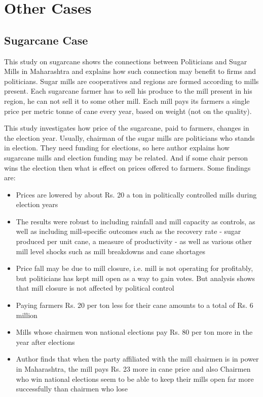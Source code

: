 \section{ Other Cases}

\subsection{Sugarcane Case}

This \cite{sugarcane} study on sugarcane shows the connections between Politicians and Sugar Mills in Maharashtra and explains how such connection may benefit to firms and politicians. Sugar mills are cooperatives and regions are formed according to mills present. Each sugarcane farmer has to sell his produce to the mill present in his region, he can not sell it to some other mill. Each mill pays its farmers a single price per metric tonne of cane every year, based on weight (not on the quality).

This study investigates how price of the sugarcane, paid to farmers, changes in the election year. Usually, chairman of the sugar mills are politicians who stands in election. They need funding for elections, so here author explains how sugarcane mills and election funding may be related. And if some chair person wins the election then what is effect on prices offered to farmers. Some findings are:

\begin{itemize}

\item Prices are lowered by about Rs. 20 a ton in politically controlled mills during election years

\item The results were robust to including rainfall and mill capacity as controls, as well as including mill-specific outcomes such as the recovery rate - sugar produced per unit cane, a measure of productivity - as well as various other mill level shocks such as mill breakdowns and cane shortages

\item Price fall may be due to mill closure, i.e. mill is not operating for profitably, but politicians has kept mill open as a way to gain votes. But analysis shows that mill closure is not affected by political control

\item Paying farmers Rs. 20 per ton less for their cane amounts to a total of Rs. 6 million

\item Mills whose chairmen won national elections pay Rs. 80 per ton more in the year after elections

\item Author finds that when the party affiliated with the mill chairmen is in power in Maharashtra, the mill pays Rs. 23 more in cane price and also Chairmen who win national elections seem to be able to keep their mills open far more successfully than chairmen who lose

\end{itemize}

